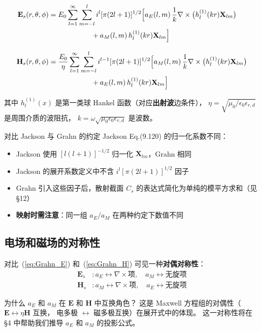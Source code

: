 \begin{align}
  \mathbf{E}_s(r,\theta,\phi) &= E_0\sum_{l=1}^\infty\sum_{m=-l}^l
    i^l[\pi(2l+1)]^{1/2} \Bigl[
      a_E(l,m)\,\frac{1}{k}\nabla\times\bigl(h_l^{(1)}(kr)\mathbf{X}_{lm}\bigr) \notag\\
    &\qquad\qquad\qquad + a_M(l,m)\,h_l^{(1)}(kr)\mathbf{X}_{lm} \Bigr] \label{eq:Grahn_E}\\[0.8em]
  \mathbf{H}_s(r,\theta,\phi) &= \frac{E_0}{\eta}\sum_{l=1}^\infty\sum_{m=-l}^l
    i^{l-1}[\pi(2l+1)]^{1/2} \Bigl[
      a_M(l,m)\,\frac{1}{k}\nabla\times\bigl(h_l^{(1)}(kr)\mathbf{X}_{lm}\bigr) \notag\\
    &\qquad\qquad\qquad + a_E(l,m)\,h_l^{(1)}(kr)\mathbf{X}_{lm} \Bigr] \label{eq:Grahn_H}
\end{align}

其中 $h_l^{(1)}(x)$ 是第一类球 Hankel 函数（对应\textbf{出射波}边条件），
$\eta = \sqrt{\mu_0/\epsilon_0\epsilon_{r,d}}$ 是周围介质的波阻抗，
$k = \omega\sqrt{\mu_0\epsilon_0\epsilon_{r,d}}$ 是波数。

\begin{stepbox}{对比 Jackson 与 Grahn 的约定}
Jackson Eq.(9.120) 的归一化系数不同：
\begin{itemize}
  \item Jackson 使用 $[l(l+1)]^{-1/2}$ 归一化 $\mathbf{X}_{lm}$，Grahn 相同
  \item Jackson 的展开系数定义中不含 $i^l[\pi(2l+1)]^{1/2}$ 因子
  \item Grahn 引入这些因子后，散射截面 $C_s$ 的表达式简化为单纯的模平方求和（见 \S12）
  \item \textbf{映射时需注意}：同一组 $a_E/a_M$ 在两种约定下数值不同
\end{itemize}
\end{stepbox}

\subsection{电场和磁场的对称性}

对比~(\ref{eq:Grahn_E}) 和~(\ref{eq:Grahn_H}) 可见一种\textbf{对偶对称性}：
\begin{align}
  \mathbf{E}_s &: a_E \leftrightarrow \nabla\times\text{项},\quad a_M \leftrightarrow \text{无旋项} \\
  \mathbf{H}_s &: a_M \leftrightarrow \nabla\times\text{项},\quad a_E \leftrightarrow \text{无旋项}
\end{align}

\begin{stepbox}{为什么 $a_E$ 和 $a_M$ 在 $\mathbf{E}$ 和 $\mathbf{H}$ 中互换角色？}
这是 Maxwell 方程组的对偶性（$\mathbf{E}\leftrightarrow\eta\mathbf{H}$ 互换，
电多极 $\leftrightarrow$ 磁多极互换）在展开式中的体现。
这一对称性将在 \S4 中帮助我们推导 $a_E$ 和 $a_M$ 的投影公式。
\end{stepbox}

